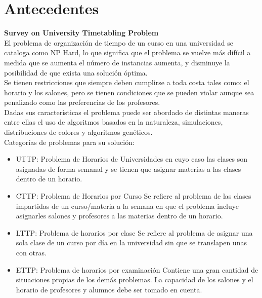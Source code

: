 \label{sec:introduccion}

\section{Antecedentes}
	\textbf{Survey on University Timetabling Problem} \\
	
	El problema de organización de tiempo de un curso en una universidad se cataloga como NP Hard, lo que significa que el problema se vuelve más difícil a medida que se aumenta el número de instancias aumenta, y disminuye la posibilidad de que exista una solución óptima. \\
	
	Se tienen restricciones que siempre deben cumplirse a toda costa tales como: el horario y los salones, pero se tienen condiciones que se pueden violar aunque sea penalizado como las preferencias de los profesores. \\ 
	
	Dadas sus características el problema puede ser abordado de distintas maneras entre ellas el uso de algoritmos basados en la naturaleza, simulaciones, distribuciones de colores y algoritmos genéticos. \\
	
	Categorías de problemas para su solución:
		
		\begin{itemize}
			\item UTTP: Problema de Horarios de Universidades
			en cuyo caso las clases son asignadas de forma semanal y se tienen que asignar materias a las clases dentro de un horario.
			
			\item CTTP: Problema de Horarios por Curso
			Se refiere al problema de las clases impartidas de un curso/materia a la semana en que el problema incluye asignarles salones y profesores a las materias dentro de un horario.
			
			\item LTTP: Problema de horarios por clase
			Se refiere al problema de asignar una sola clase de un curso por día en la universidad sin que se translapen unas con otras.
			
			\item ETTP: Problema de horarios por examinación
			Contiene una gran cantidad de situaciones propias de los demás problemas. La capacidad de los salones y el horario de profesores y alumnos debe ser tomado en cuenta.
		\end{itemize}
		
